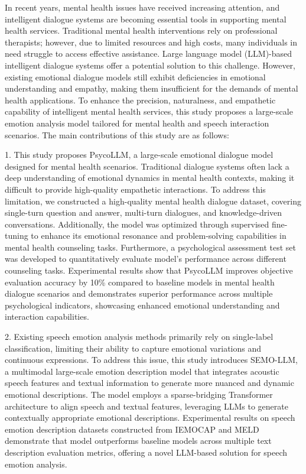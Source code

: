 \begin{abstract*}
In recent years, mental health issues have received increasing attention, and intelligent dialogue systems are becoming essential tools in supporting mental health services. Traditional mental health interventions rely on professional therapists; however, due to limited resources and high costs, many individuals in need struggle to access effective assistance. Large language model (LLM)-based intelligent dialogue systems offer a potential solution to this challenge. However, existing emotional dialogue models still exhibit deficiencies in emotional understanding and empathy, making them insufficient for the demands of mental health applications. To enhance the precision, naturalness, and empathetic capability of intelligent mental health services, this study proposes a large-scale emotion analysis model tailored for mental health and speech interaction scenarios. The main contributions of this study are as follows:

1. This study proposes PsycoLLM, a large-scale emotional dialogue model designed for mental health scenarios. Traditional dialogue systems often lack a deep understanding of emotional dynamics in mental health contexts, making it difficult to provide high-quality empathetic interactions. To address this limitation, we constructed a high-quality mental health dialogue dataset, covering single-turn question and answer, multi-turn dialogues, and knowledge-driven conversations. Additionally, the model was optimized through supervised fine-tuning to enhance its emotional resonance and problem-solving capabilities in mental health counseling tasks. Furthermore, a psychological assessment test set was developed to quantitatively evaluate model’s performance across different counseling tasks. Experimental results show that PsycoLLM improves objective evaluation accuracy by 10\% compared to baseline models in mental health dialogue scenarios and demonstrates superior performance across multiple psychological indicators, showcasing enhanced emotional understanding and interaction capabilities.

2. Existing speech emotion analysis methods primarily rely on single-label classification, limiting their ability to capture emotional variations and continuous expressions. To address this issue, this study introduces SEMO-LLM, a multimodal large-scale emotion description model that integrates acoustic speech features and textual information to generate more nuanced and dynamic emotional descriptions. The model employs a sparse-bridging Transformer architecture to align speech and textual features, leveraging LLMs to generate contextually appropriate emotional descriptions. Experimental results on speech emotion description datasets constructed from IEMOCAP and MELD demonstrate that model outperforms baseline models across multiple text description evaluation metrics, offering a novel LLM-based solution for speech emotion analysis.


\end{abstract*}
